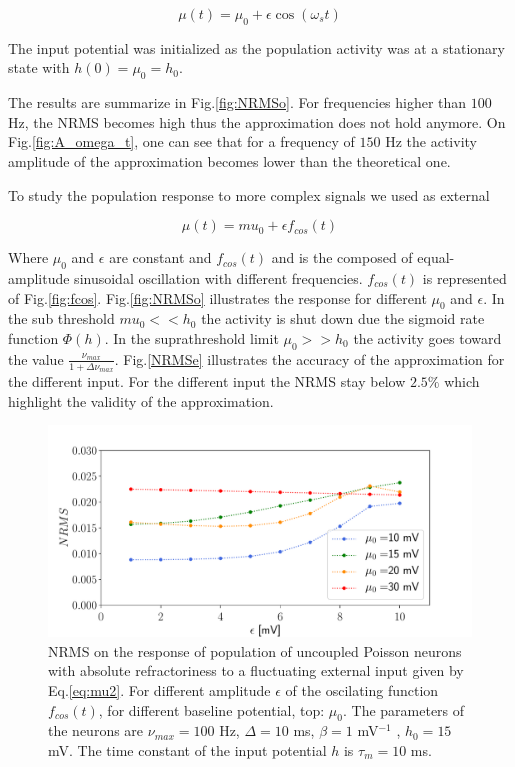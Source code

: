 \documentclass[12pt,twoside]{report}
\begin{document}
\begin{equation}
\label{eq:mut}
\mu(t)=\mu_0 + \epsilon \cos(\omega_st)
\end{equation}

The input potential was initialized as the population activity was at a stationary state with $h(0)=\mu_0=h_0$. 

The results are summarize in Fig.\ref{fig:NRMSo}. For frequencies higher than $100$ Hz, the NRMS becomes high thus the approximation does not hold anymore. On Fig.\ref{fig:A_omega_t}, one can see that for a frequency of $150$ Hz the activity amplitude of the approximation becomes lower than the theoretical one.



To study the population response to more complex signals we used as external

\begin{equation}
\label{eq:mu2}
\mu(t)=mu_0+\epsilon f_{cos}(t)
\end{equation} 


Where $\mu_0$ and $\epsilon$ are constant and $f_{cos}(t)$ and is the composed of equal-amplitude sinusoidal oscillation with different frequencies. $f_{cos}(t)$ is represented of Fig.\ref{fig:fcos}. Fig.\ref{fig:NRMSo} illustrates the response for different $\mu_0$ and $\epsilon$. In the sub threshold $mu_0<<h_0$ the activity is shut down due the sigmoid rate function $\Phi(h)$. In the suprathreshold limit $\mu_0>>h_0$ the activity goes toward the value $\frac{\nu_{max}}{1+\Delta\nu_{max}}$. Fig.\ref{NRMSe} illustrates the accuracy of the approximation for the different input. For the different input the NRMS stay below $2.5\%$ which highlight the validity of the approximation.


\begin{figure}[h!]
	\centering
	\includegraphics[width=0.8\linewidth]{NRMSe.pdf}
	\caption{NRMS on the response of population of uncoupled Poisson neurons with absolute refractoriness to a fluctuating external input given by Eq.\eqref{eq:mu2}. For different amplitude $\epsilon$ of the oscilating function $f_{cos}(t)$, for different baseline potential, top: $\mu_0$. The parameters of the neurons are $\nu_{max}=100$ Hz, $\Delta=10$ ms, $\beta=1$ mV$^{-1}$ , $h_0=15$ mV. The time constant of the input potential $h$ is $\tau_m=10$ ms.
	}
	\label{fig:NRMSe.}
\end{figure}
\end{document}
